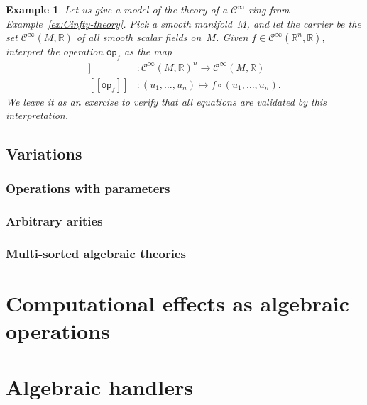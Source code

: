 \documentclass{amsart}
\newcommand{\RR}{\mathbb{R}}
\newcommand{\op}{\mathsf{op}}
\newcommand{\Cinfty}{\mathcal{C}^\infty}
\newcommand{\sem}[1]{[\![#1]\!]}
\newtheorem{example}[definition]{Example}
\begin{document}
\begin{example}
  Let us give a model of the theory of a $\Cinfty$-ring from
  Example~\ref{ex:Cinfty-theory}. Pick a smooth manifold~$M$, and let the carrier be the
  set $\Cinfty(M, \RR)$ of all smooth scalar fields on~$M$. Given
  $f \in \Cinfty(\RR^n, \RR)$, interpret the operation $\op_f$ as the map
  \begin{align*}
    \sem{\op_f} &: \Cinfty(M, \RR)^n \to \Cinfty(M, \RR) \\
    \sem{\op_f} &: (u_1, \ldots, u_n) \mapsto f \circ (u_1, \ldots, u_n).
  \end{align*}
  We leave it as an exercise to verify that all equations are validated by this
  interpretation.
\end{example}


\subsection{Variations}
\label{sec:variations}

\subsubsection{Operations with parameters}
\label{sec:oper-with-param}

\subsubsection{Arbitrary arities}
\label{sec:arbitrary-arities}

\subsubsection{Multi-sorted algebraic theories}
\label{sec:multi-sort-algebr}


\section{Computational effects as algebraic operations}
\label{sec:comp-effects-as}

\section{Algebraic handlers}
\label{sec:algebraic-handlers}
\end{document}
